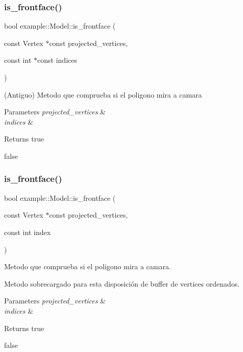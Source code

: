 \subsubsection{\texorpdfstring{is\_frontface()}{is\_frontface()}\hspace{0.1cm}{\footnotesize\ttfamily [1/2]}}
{\footnotesize\ttfamily bool example\+::\+Model\+::is\+\_\+frontface (\begin{DoxyParamCaption}\item[{const Vertex $\ast$const}]{projected\+\_\+vertices,  }\item[{const int $\ast$const}]{indices }\end{DoxyParamCaption})}



(Antiguo) Metodo que comprueba si el poligono mira a camara 


\begin{DoxyParams}{Parameters}
{\em projected\+\_\+vertices} & \\
\hline
{\em indices} & \\
\hline
\end{DoxyParams}
\begin{DoxyReturn}{Returns}
true 

false 
\end{DoxyReturn}
\mbox{\label{classexample_1_1_model_a576801ca87f261183fa0b0720114fa04}} 
\subsubsection{\texorpdfstring{is\_frontface()}{is\_frontface()}\hspace{0.1cm}{\footnotesize\ttfamily [2/2]}}
{\footnotesize\ttfamily bool example\+::\+Model\+::is\+\_\+frontface (\begin{DoxyParamCaption}\item[{const Vertex $\ast$const}]{projected\+\_\+vertices,  }\item[{const int}]{index }\end{DoxyParamCaption})}



Metodo que comprueba si el poligono mira a camara. 

Metodo sobrecargado para esta disposición de buffer de vertices ordenados.


\begin{DoxyParams}{Parameters}
{\em projected\+\_\+vertices} & \\
\hline
{\em indices} & \\
\hline
\end{DoxyParams}
\begin{DoxyReturn}{Returns}
true 

false
\end{DoxyReturn}

